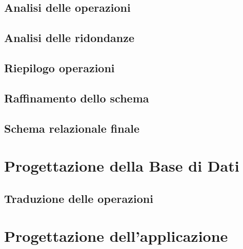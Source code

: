 \documentclass[a4paper,11pt]{report}
\begin{document}
\section{Analisi delle operazioni}

\section{Analisi delle ridondanze}

\section{Riepilogo operazioni}

\section{Raffinamento dello schema}

\section{Schema relazionale finale}

\chapter{Progettazione della Base di Dati}
\section{Traduzione delle operazioni}

\chapter{Progettazione dell'applicazione}
\end{document}
